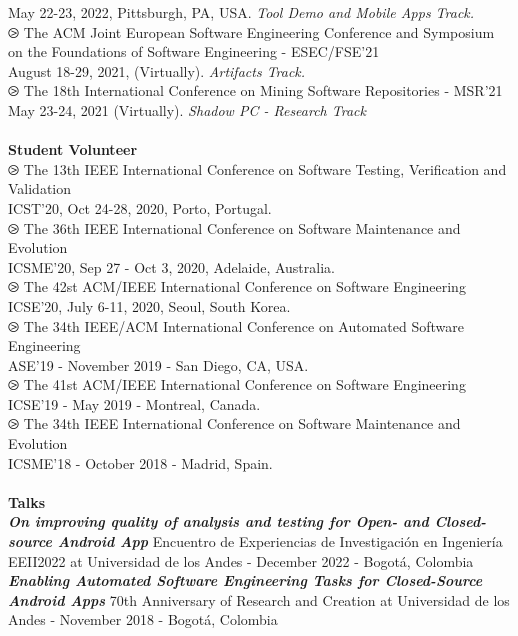 \documentclass[letterpaper,11pt,oneside]{article}
\begin{document}
\indent May 22-23, 2022, Pittsburgh, PA, USA. \textit{Tool Demo and Mobile Apps Track.} \\
$\ogreaterthan$ The ACM Joint European Software Engineering Conference and Symposium on the Foundations of Software Engineering - ESEC/FSE'21\\ 
\indent August 18-29, 2021, (Virtually). \textit{Artifacts Track.} \\
$\ogreaterthan$ The 18th International Conference on Mining Software Repositories - MSR'21\\
\indent May 23-24, 2021 (Virtually). \textit{Shadow PC - Research Track} \\
\\
\noindent \large{\textbf{Student Volunteer}} \\
$\ogreaterthan$ The 13th IEEE International Conference on Software Testing, Verification and Validation\\
\indent ICST'20, Oct 24-28, 2020, Porto, Portugal. \\
$\ogreaterthan$ The 36th IEEE International Conference on Software Maintenance and Evolution\\
\indent ICSME'20, Sep 27 - Oct 3, 2020, Adelaide, Australia. \\
$\ogreaterthan$ The 42st ACM/IEEE International Conference on Software Engineering \\
\indent ICSE'20, July 6-11, 2020, Seoul, South Korea. \\
$\ogreaterthan$ The 34th IEEE/ACM International Conference on Automated Software Engineering \\
\indent ASE'19 - November 2019 - San Diego, CA, USA. \\
$\ogreaterthan$ The 41st ACM/IEEE International Conference on Software Engineering \\
\indent ICSE'19 - May 2019 - Montreal, Canada. \\
$\ogreaterthan$ The 34th IEEE International Conference on Software Maintenance and Evolution \\
\indent ICSME'18 - October 2018 - Madrid, Spain. \\
\\
\noindent \large{\textbf{Talks}} \\
\textit{\textbf{On improving quality of analysis and testing for Open- and Closed-source Android App}} Encuentro de Experiencias de Investigaci\'on en Ingeniería EEII2022 at Universidad de los Andes - December 2022 - Bogot\'a, Colombia
\\
\textit{\textbf{Enabling Automated Software Engineering Tasks for Closed-Source Android Apps}} 70th Anniversary of Research and Creation at Universidad de los Andes - November 2018 - Bogot\'a, Colombia
\end{document}
